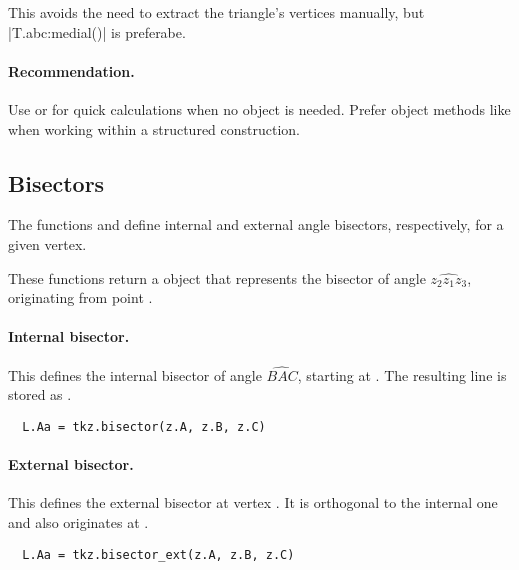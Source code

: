 This avoids the need to extract the triangle’s vertices manually, but |T.abc:medial()| is preferabe.

\paragraph{Recommendation.}
Use  or  for quick calculations when no object is needed. Prefer object methods like  when working within a structured construction.


\subsection{Bisectors} %
\label{sub:bisector}

The functions  and  define internal and external angle bisectors, respectively, for a given vertex.

These functions return a  object that represents the bisector of angle $\widehat{z_2 z_1 z_3}$, originating from point .

\paragraph{Internal bisector.}
 This defines the internal bisector of angle $ \widehat{BAC}$, starting at . The resulting line is stored as .

\begin{mybox}
\begin{verbatim}
  L.Aa = tkz.bisector(z.A, z.B, z.C)
\end{verbatim}
\end{mybox}

\paragraph{External bisector.}
This defines the external bisector at vertex . It is orthogonal to the internal one and also originates at .

\begin{mybox}
\begin{verbatim}
  L.Aa = tkz.bisector_ext(z.A, z.B, z.C)
\end{verbatim}
\end{mybox}


